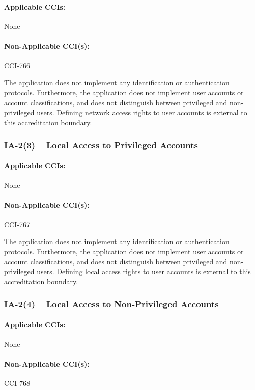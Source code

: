 \documentclass[letterpaper, 10pt, twoside]{article}
\begin{document}
\paragraph{Applicable CCIs:} None

\paragraph{Non-Applicable CCI(s):} CCI-766

The application does not implement any identification or authentication protocols. Furthermore, the application does not implement user accounts or account classifications, and does not distinguish between privileged and non-privileged users. Defining network access rights to user accounts is external to this accreditation boundary.

\subsubsection{IA-2(3) -- Local Access to Privileged Accounts}

\paragraph{Applicable CCIs:} None

\paragraph{Non-Applicable CCI(s):} CCI-767

The application does not implement any identification or authentication protocols. Furthermore, the application does not implement user accounts or account classifications, and does not distinguish between privileged and non-privileged users. Defining local access rights to user accounts is external to this accreditation boundary.

\subsubsection{IA-2(4) -- Local Access to Non-Privileged Accounts}

\paragraph{Applicable CCIs:} None

\paragraph{Non-Applicable CCI(s):} CCI-768
\end{document}
